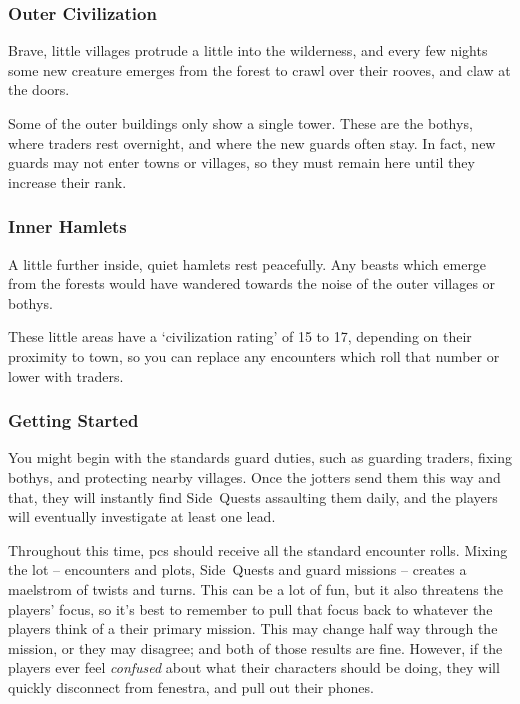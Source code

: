 \begin{multicols}{2}
\subsubsection{Outer Civilization}
Brave, little \glspl{village} protrude a little into the wilderness, and every few nights some new creature emerges from the forest to crawl over their rooves, and claw at the doors.

Some of the outer buildings only show a single tower.
These are the \glspl{bothy}, where traders rest overnight, and where the new \glspl{guard} often stay.
In fact, new \glspl{guard} may not enter towns or \glspl{village}, so they must remain here until they increase their rank.%

\subsubsection{Inner Hamlets}
A little further inside, quiet hamlets rest peacefully.
Any beasts which emerge from the forests would have wandered towards the noise of the outer \glspl{village} or \glspl{bothy}.

These little areas have a `civilization rating' of 15 to 17, depending on their proximity to town, so you can replace any encounters which roll that number or lower with traders.%

\subsubsection{Getting Started}

You might begin with the standards \gls{guard} duties,%
such as guarding traders, fixing \glspl{bothy}, and protecting nearby \glspl{village}.
Once the \glspl{jotter} send them this way and that, they will instantly find Side~Quests assaulting them daily, and the players will eventually investigate at least one lead.

Throughout this time, \glspl{pc} should receive all the standard encounter rolls.
Mixing the lot -- encounters and plots, Side~Quests and \gls{guard} missions -- creates a maelstrom of twists and turns.
This can be a lot of fun, but it also threatens the players' focus, so it's best to remember to pull that focus back to whatever the players think of a their primary mission.
This may change half way through the mission, or they may disagree; and both of those results are fine.
However, if the players ever feel \emph{confused} about what their characters should be doing, they will quickly disconnect from \gls{fenestra}, and pull out their phones.


\end{multicols}

